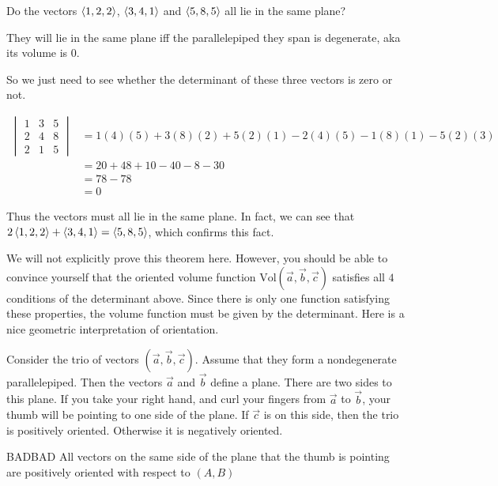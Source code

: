 \documentclass{ximera}
\begin{document}
\begin{question}
  Do the vectors $\left\langle 1,2,2\right\rangle$, $\left\langle 3,4,1\right\rangle$ and $\left\langle 5,8,5\right\rangle$ all lie in the same plane?
  
  \begin{multipleChoice}
  \end{multipleChoice}
  
  \begin{hint}
    They will lie in the same plane iff the parallelepiped they span
    is degenerate, aka its volume is $0$.
  \end{hint}
  
  \begin{hint}
    So we just need to see whether the determinant of these three
    vectors is zero or not.
  \end{hint}
  
  \begin{hint}
    \begin{align*}
      \begin{vmatrix}
	1&3&5\\
	2&4&8\\
	2&1&5
      \end{vmatrix} &= 1(4)(5)+3(8)(2)+5(2)(1)-2(4)(5)-1(8)(1)-5(2)(3)\\
      &=20+48+10-40-8-30\\
      &=78-78\\
      &=0
    \end{align*}
    
    Thus the vectors must all lie in the same plane.  In fact, we can
    see that $2\left\langle 1,2,2\right\rangle+\left\langle 3,4,1\right\rangle=\left\langle 5,8,5\right\rangle$, which
    confirms this fact.
  \end{hint}
  
\end{question}
We will not explicitly prove this theorem here.  However, you
should be able to convince yourself that the oriented volume
function $\textrm{Vol}(\vec{a},\vec{b},\vec{c})$ satisfies all
$4$ conditions of the determinant above.  Since there is only
one function satisfying these properties, the volume function
must be given by the determinant.
Here is a nice geometric interpretation of orientation.

\begin{theorem}
  Consider the trio of vectors $(\vec{a},\vec{b},\vec{c})$.  Assume
  that they form a nondegenerate parallelepiped.  Then the vectors
  $\vec{a}$ and $\vec{b}$ define a plane.  There are two sides to this
  plane.  If you take your right hand, and curl your fingers from
  $\vec{a}$ to $\vec{b}$, your thumb will be pointing to one side of
  the plane.  If $\vec{c}$ is on this side, then the trio is
  positively oriented.  Otherwise it is negatively oriented.
  \begin{center}
    BADBAD
    All vectors on the same side of the plane that the thumb is pointing are positively oriented with respect to $(A,B)$
  \end{center}
\end{theorem}
\end{document}
